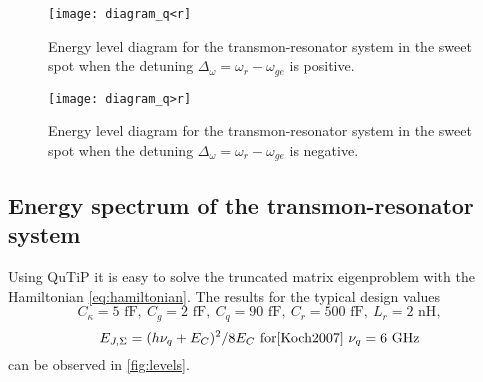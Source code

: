 \documentclass[12pt, twoside]{report}
\numberwithin{equation}{section}
\begin{document}
\begin{figure}[h]
\centering
\texttt{[image: diagram\_q<r]}
\caption{Energy level diagram for the transmon-resonator system in the sweet spot when the detuning $\Delta_\omega = \omega_r-\omega_{ge}$ is positive.}
\label{fig:diagram}
\end{figure}

\begin{figure}[h]
\centering
\texttt{[image: diagram\_q>r]}
\caption{Energy level diagram for the transmon-resonator system in the sweet spot when the detuning $\Delta_\omega = \omega_r-\omega_{ge}$ is negative.}
\label{fig:diagram2}
\end{figure}

\subsection{Energy spectrum of the transmon-resonator system}

Using QuTiP\cite{Johansson2011} it is easy to solve the truncated matrix eigenproblem with the Hamiltonian \eqref{eq:hamiltonian}. The results for the typical design values
$$
C_\kappa = 5 \text{ fF},\ C_g = 2 \text{ fF},\ C_q = 90 \text{ fF},\ C_r = 500 \text{ fF},\ L_r = 2 \text{ nH}, $$
$$E_{J, \Sigma} = (h \nu_q + E_C)^2/8 E_C\ \text{for\cite{Koch2007}}\ \nu_q = 6\ \text{GHz}
$$
can be observed in \autoref{fig:levels}.
\end{document}
